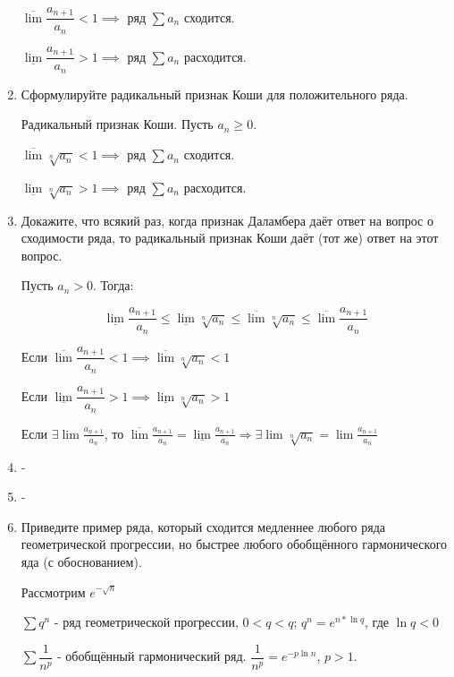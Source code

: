 \documentclass[a4paper]{article}
\begin{document}
\begin{enumerate}
\begin{theorem}
            $\overline{\lim} \dfrac{a_{n+1}}{a_n} < 1 \implies $ ряд $\sum a_n$ сходится.
            
            $\underline{\lim} \dfrac{a_{n+1}}{a_n} > 1 \implies $ ряд $\sum a_n$ расходится.
        \end{theorem}
        \item Сформулируйте радикальный признак Коши для положительного ряда.
        \begin{theorem}
            Радикальный признак Коши. Пусть $a_n \geq 0$.
            
            $\overline{\lim} \sqrt[n]{a_n} < 1 \implies$ ряд $\sum a_n$ сходится.
             
            $\underline{\lim} \sqrt[n]{a_n} > 1 \implies$ ряд $\sum a_n$ расходится.
        \end{theorem}
        \item Докажите, что всякий раз, когда признак Даламбера даёт ответ на вопрос о сходимости ряда, то радикальный признак Коши даёт (тот же) ответ на этот вопрос.
        
        Пусть $a_n > 0$. Тогда:

        $$ \underline{\lim} \dfrac{a_{n+1}}{a_n} \leq \underline{\lim}{\sqrt[n]{a_n}} \leq \overline{\lim}{\sqrt[n]{a_n}} \leq \overline{\lim}\dfrac{a_{n+1}}{a_n}$$

        Если $\overline{\lim}\dfrac{a_{n+1}}{a_n} < 1 \implies \overline{\lim}{\sqrt[n]{a_n}} < 1$

        Если $\underline{\lim}\dfrac{a_{n+1}}{a_n} > 1 \implies \underline{\lim} \sqrt[n]{a_n} > 1$

        Если $\exists \lim \frac{a_{n+1}}{a_n}$, то $\overline{\lim} \frac{a_{n+1}}{a_n} = \underline{\lim} \frac{a_{n+1}}{a_n} \Rightarrow \exists \lim \sqrt[n]{a_n} = \lim \frac{a_{n+1}}{a_n}$
        \item -
        \item -
        \item Приведите пример ряда, который сходится медленнее любого ряда геометрической прогрессии, но быстрее любого обобщённого гармонического яда (с обоснованием).
        
        Рассмотрим $e^{-\sqrt{n}}$
        
        $\sum q^n$ - ряд геометрической прогрессии, $0 < q < q$; $q^n = e^{n * \ln q}$, где $\ln q < 0$
        
        $\sum \dfrac{1}{n^p}$ - обобщённый гармонический ряд. $\dfrac{1}{n^p} = e^{-p \ln n}$, $p > 1$.
        

\end{enumerate}
\end{document}
